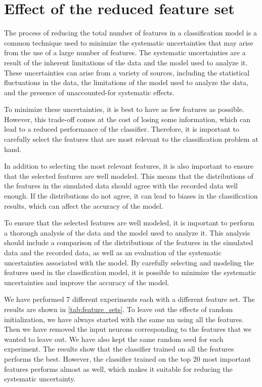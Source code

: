 \section{Effect of the reduced feature set}

The process of reducing the total number of features in a classification model is a common technique used to minimize
the systematic uncertainties that may arise from the use of a large number of features. The systematic uncertainties are
a result of the inherent limitations of the data and the model used to analyze it. These uncertainties can arise from a
variety of sources, including the statistical fluctuations in the data, the limitations of the model used to analyze the
data, and the presence of unaccounted-for systematic effects.

To minimize these uncertainties, it is best to have as few features as possible. However, this trade-off comes at the
cost of losing some information, which can lead to a reduced performance of the classifier. Therefore, it is important
to carefully select the features that are most relevant to the classification problem at hand.

In addition to selecting the most relevant features, it is also important to ensure that the selected features are well
modeled. This means that the distributions of the features in the simulated data should agree with the recorded data
well enough. If the distributions do not agree, it can lead to biases in the classification results, which can affect
the accuracy of the model.

To ensure that the selected features are well modeled, it is important to perform a thorough analysis of the data and
the model used to analyze it. This analysis should include a comparison of the distributions of the features in the
simulated data and the recorded data, as well as an evaluation of the systematic uncertainties associated with the
model. By carefully selecting and modeling the features used in the classification model, it is possible to minimize the
systematic uncertainties and improve the accuracy of the model.

We have performed 7 different experiments each with a different feature set. The results are shown in
\autoref{tab:feature_sets}. To leave out the effects of random initialization, we have always started with the same
\gls{nn} using all the features. Then we have removed the input neurons corresponding to the features that we wanted to
leave out. We have also kept the same random seed for each experiment. The results show that the classifier trained on
all the features performs the best. However, the classifier trained on the top 20 most important features performs
almost as well, which makes it suitable for reducing the systematic uncertainty.

